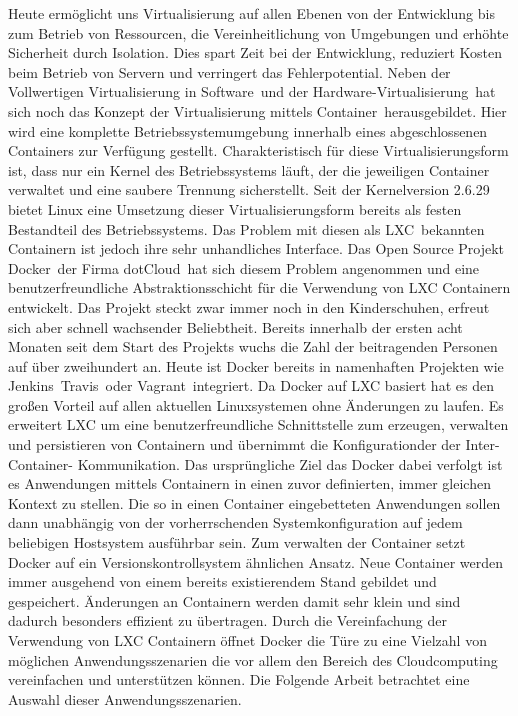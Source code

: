 Heute ermöglicht uns Virtualisierung auf \glqq allen Ebenen von der Entwicklung bis zum Betrieb von Ressourcen, die Vereinheitlichung von Umgebungen und erhöhte Sicherheit durch Isolation. Dies spart Zeit bei der Entwicklung, reduziert Kosten beim Betrieb von Servern und verringert das Fehlerpotential.\grqq \cite[S. 1]{schroder_container-virtualisierung_2014}
Neben der Vollwertigen \grq Virtualisierung in Software\grq\ und der \grq Hardware-Virtualisierung\grq\ hat sich noch das Konzept der \grq Virtualisierung mittels Container\grq\ herausgebildet.
\glqq Hier wird eine komplette Betriebssystemumgebung innerhalb eines abgeschlossenen Containers zur Verfügung gestellt. Charakteristisch für diese Virtualisierungsform ist, dass nur ein Kernel des Betriebssystems läuft, der die jeweiligen Container verwaltet und eine saubere Trennung sicherstellt.\grqq \cite{plotner_linux_2012}
Seit der Kernelversion 2.6.29 \cite{fischer_linux_2014} bietet Linux eine Umsetzung dieser Virtualisierungsform bereits als festen Bestandteil des Betriebssystems.
Das Problem mit diesen als \grq LXC\grq\ bekannten Containern ist jedoch ihre sehr unhandliches Interface.
Das Open Source Projekt \grq Docker\grq\ der Firma \grq dotCloud\grq\ hat sich diesem Problem angenommen und eine benutzerfreundliche Abstraktionsschicht für die Verwendung von LXC Containern entwickelt. Das Projekt steckt zwar immer noch in den Kinderschuhen, erfreut sich aber schnell wachsender Beliebtheit.
Bereits innerhalb der ersten acht Monaten seit dem Start des Projekts wuchs die Zahl der beitragenden Personen auf über zweihundert an. Heute ist Docker bereits in namenhaften Projekten wie \grq Jenkins\grq\, \grq Travis\grq\ oder \grq Vagrant\grq\ integriert. \cite{docker_docker_????}
Da Docker auf LXC basiert hat es den großen Vorteil auf allen aktuellen Linuxsystemen ohne Änderungen zu laufen. Es erweitert LXC um eine benutzerfreundliche Schnittstelle zum erzeugen, verwalten und persistieren von Containern und übernimmt die Konfigurationder der Inter-Container-
Kommunikation. Das ursprüngliche Ziel das Docker dabei verfolgt ist es Anwendungen mittels Containern in einen zuvor definierten, immer gleichen Kontext zu stellen. Die so in einen Container eingebetteten Anwendungen sollen dann unabhängig von der vorherrschenden Systemkonfiguration auf jedem beliebigen Hostsystem ausführbar sein.
Zum verwalten der Container setzt Docker auf ein Versionskontrollsystem ähnlichen Ansatz.
Neue Container werden immer ausgehend von einem bereits existierendem Stand gebildet und gespeichert. Änderungen an Containern werden damit sehr klein und sind dadurch besonders effizient zu übertragen.
Durch die Vereinfachung der Verwendung von LXC Containern öffnet Docker die Türe zu eine Vielzahl von möglichen Anwendungsszenarien die vor allem den Bereich des Cloudcomputing vereinfachen und unterstützen können.
Die Folgende Arbeit betrachtet eine Auswahl dieser Anwendungsszenarien.
